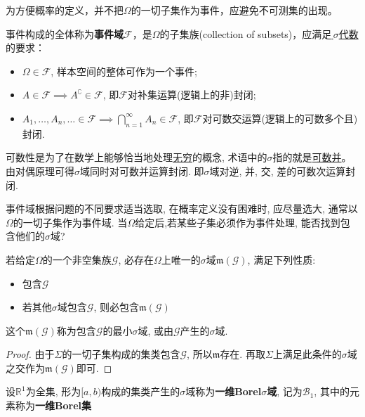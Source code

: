 为方便概率的定义，并不把$\Omega$的一切子集作为事件，应避免不可测集的出现。

\begin{definition}
    事件构成的全体称为\textbf{事件域}$\mathscr{F}$，是$\Omega$的子集族(collection of subsets)，应满足\underline{\,$\sigma$代数}的要求：
    \begin{itemize}
        \item $\Omega \in \mathscr{F}$, 样本空间的整体可作为一个事件;
        \item $A\in\mathscr{F} \implies A^{\complement}\in\mathscr{F}$, 即$\mathscr{F}$对补集运算(逻辑上的非)封闭;
        \item $A_{1},\dots,A_{n},\ldots \in \mathscr{F} \implies \bigcap_{n=1}^{\infty}A_{n} \in \mathscr{F}$, 即$\mathscr{F}$对可数交运算(逻辑上的可数多个且)封闭.
    \end{itemize}
\end{definition}

\begin{note}
    可数性是为了在数学上能够恰当地处理\underline{无穷}的概念, 术语中的$\sigma$指的就是\underline{可数并}。由对偶原理可得$\sigma$域同时对可数并运算封闭. 即$\sigma$域对逆, 并, 交, 差的可数次运算封闭.
\end{note}

事件域根据问题的不同要求适当选取, 在概率定义没有困难时, 应尽量选大, 通常以$\Omega$的一切子集作为事件域. 当$\Omega$给定后,若某些子集必须作为事件处理, 能否找到包含他们的$\sigma$域?

\begin{proposition}
    若给定$\Omega$的一个非空集族$\mathscr{G}$, 必存在$\Omega$上唯一的$\sigma$域$\mathfrak{m}(\mathscr{G})$, 满足下列性质:
    \begin{itemize}
        \item 包含$\mathscr{G}$
        \item 若其他$\sigma$域包含$\mathscr{G}$, 则必包含$\mathfrak{m}(\mathscr{G})$
    \end{itemize}
    这个$\mathfrak{m}(\mathscr{G})$称为包含$\mathscr{G}$的最小$\sigma$域, 或由$\mathscr{G}$产生的$\sigma$域.
\end{proposition}

\begin{proof}
    由于$\Sigma$的一切子集构成的集类包含$\mathscr{G}$, 所以$\mathfrak{m}$存在. 再取$\Sigma$上满足此条件的$\sigma$域之交作为$\mathfrak{m}(\mathscr{G})$即可.
\end{proof}

\begin{definition}
    设$\mathbb{R}^1$为全集, 形为$[a,b)$构成的集类产生的$\sigma$域称为\textbf{一维Borel$\sigma$域}, 记为$\mathscr{B}_1$, 其中的元素称为\textbf{一维Borel集}
\end{definition}

